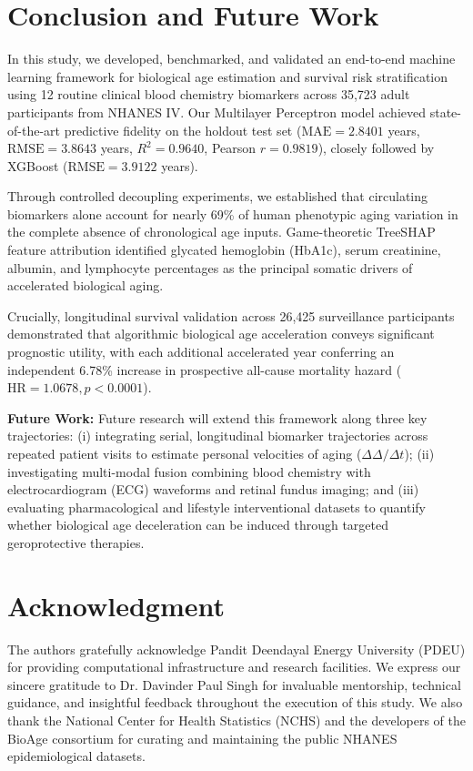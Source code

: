 \documentclass[conference]{IEEEtran}
\begin{document}
\section{Conclusion and Future Work}
In this study, we developed, benchmarked, and validated an end-to-end machine learning framework for biological age estimation and survival risk stratification using 12 routine clinical blood chemistry biomarkers across 35,723 adult participants from NHANES IV. Our Multilayer Perceptron model achieved state-of-the-art predictive fidelity on the holdout test set ($\text{MAE} = 2.8401$ years, $\text{RMSE} = 3.8643$ years, $R^2 = 0.9640$, Pearson $r = 0.9819$), closely followed by XGBoost ($\text{RMSE} = 3.9122$ years).

Through controlled decoupling experiments, we established that circulating biomarkers alone account for nearly 69\% of human phenotypic aging variation in the complete absence of chronological age inputs. Game-theoretic TreeSHAP feature attribution identified glycated hemoglobin (HbA1c), serum creatinine, albumin, and lymphocyte percentages as the principal somatic drivers of accelerated biological aging.

Crucially, longitudinal survival validation across 26,425 surveillance participants demonstrated that algorithmic biological age acceleration conveys significant prognostic utility, with each additional accelerated year conferring an independent 6.78\% increase in prospective all-cause mortality hazard ($\text{HR} = 1.0678, p < 0.0001$).

\textbf{Future Work:} Future research will extend this framework along three key trajectories: (i) integrating serial, longitudinal biomarker trajectories across repeated patient visits to estimate personal velocities of aging ($\Delta\Delta/\Delta t$); (ii) investigating multi-modal fusion combining blood chemistry with electrocardiogram (ECG) waveforms and retinal fundus imaging; and (iii) evaluating pharmacological and lifestyle interventional datasets to quantify whether biological age deceleration can be induced through targeted geroprotective therapies.

\section*{Acknowledgment}
The authors gratefully acknowledge Pandit Deendayal Energy University (PDEU) for providing computational infrastructure and research facilities. We express our sincere gratitude to Dr. Davinder Paul Singh for invaluable mentorship, technical guidance, and insightful feedback throughout the execution of this study. We also thank the National Center for Health Statistics (NCHS) and the developers of the BioAge consortium for curating and maintaining the public NHANES epidemiological datasets.
\end{document}
